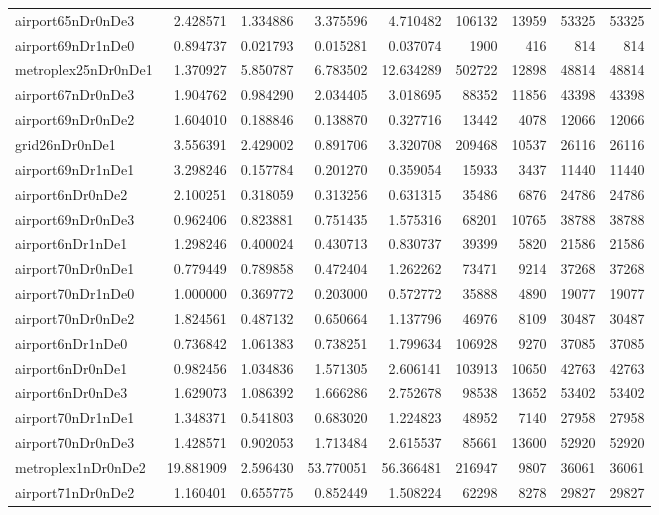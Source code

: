\begin{longtable}{|l|r|r|r|r|r|r|r|r|}
airport65nDr0nDe3 & 2.428571 & 1.334886 & 3.375596 & 4.710482 & 106132 & 13959 & 53325 & 53325 \\
airport69nDr1nDe0 & 0.894737 & 0.021793 & 0.015281 & 0.037074 & 1900 & 416 & 814 & 814 \\
metroplex25nDr0nDe1 & 1.370927 & 5.850787 & 6.783502 & 12.634289 & 502722 & 12898 & 48814 & 48814 \\
airport67nDr0nDe3 & 1.904762 & 0.984290 & 2.034405 & 3.018695 & 88352 & 11856 & 43398 & 43398 \\
airport69nDr0nDe2 & 1.604010 & 0.188846 & 0.138870 & 0.327716 & 13442 & 4078 & 12066 & 12066 \\
grid26nDr0nDe1 & 3.556391 & 2.429002 & 0.891706 & 3.320708 & 209468 & 10537 & 26116 & 26116 \\
airport69nDr1nDe1 & 3.298246 & 0.157784 & 0.201270 & 0.359054 & 15933 & 3437 & 11440 & 11440 \\
airport6nDr0nDe2 & 2.100251 & 0.318059 & 0.313256 & 0.631315 & 35486 & 6876 & 24786 & 24786 \\
airport69nDr0nDe3 & 0.962406 & 0.823881 & 0.751435 & 1.575316 & 68201 & 10765 & 38788 & 38788 \\
airport6nDr1nDe1 & 1.298246 & 0.400024 & 0.430713 & 0.830737 & 39399 & 5820 & 21586 & 21586 \\
airport70nDr0nDe1 & 0.779449 & 0.789858 & 0.472404 & 1.262262 & 73471 & 9214 & 37268 & 37268 \\
airport70nDr1nDe0 & 1.000000 & 0.369772 & 0.203000 & 0.572772 & 35888 & 4890 & 19077 & 19077 \\
airport70nDr0nDe2 & 1.824561 & 0.487132 & 0.650664 & 1.137796 & 46976 & 8109 & 30487 & 30487 \\
airport6nDr1nDe0 & 0.736842 & 1.061383 & 0.738251 & 1.799634 & 106928 & 9270 & 37085 & 37085 \\
airport6nDr0nDe1 & 0.982456 & 1.034836 & 1.571305 & 2.606141 & 103913 & 10650 & 42763 & 42763 \\
airport6nDr0nDe3 & 1.629073 & 1.086392 & 1.666286 & 2.752678 & 98538 & 13652 & 53402 & 53402 \\
airport70nDr1nDe1 & 1.348371 & 0.541803 & 0.683020 & 1.224823 & 48952 & 7140 & 27958 & 27958 \\
airport70nDr0nDe3 & 1.428571 & 0.902053 & 1.713484 & 2.615537 & 85661 & 13600 & 52920 & 52920 \\
metroplex1nDr0nDe2 & 19.881909 & 2.596430 & 53.770051 & 56.366481 & 216947 & 9807 & 36061 & 36061 \\
airport71nDr0nDe2 & 1.160401 & 0.655775 & 0.852449 & 1.508224 & 62298 & 8278 & 29827 & 29827 \\

\end{longtable}
